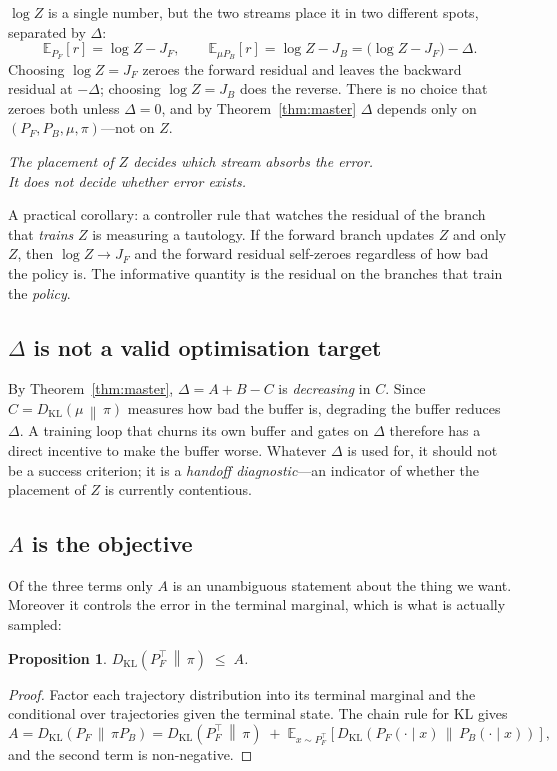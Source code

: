\documentclass[11pt]{article}
\theoremstyle{plain}
\newtheorem{proposition}[theorem]{Proposition}
\theoremstyle{definition}
\theoremstyle{remark}
\newcommand{\KL}[2]{D_{\mathrm{KL}}\!\left(#1 \,\middle\|\, #2\right)}
\newcommand{\E}[2]{\mathbb{E}_{#1}\!\left[#2\right]}
\newcommand{\PF}{P_{F}}
\newcommand{\PB}{P_{B}}
\newcommand{\JF}{J_{F}}
\newcommand{\JB}{J_{B}}
\begin{document}
$\log Z$ is a single number, but the two streams place it in two different spots,
separated by $\Delta$:
\[
  \E{\PF}{r} = \log Z - \JF,
  \qquad
  \E{\mu\PB}{r} = \log Z - \JB
  = \bigl(\log Z - \JF\bigr) - \Delta .
\]
Choosing $\log Z = \JF$ zeroes the forward residual and leaves the backward
residual at $-\Delta$; choosing $\log Z = \JB$ does the reverse. There is no
choice that zeroes both unless $\Delta = 0$, and by Theorem~\ref{thm:master}
$\Delta$ depends only on $(\PF,\PB,\mu,\pi)$---not on $Z$.

\begin{center}
\emph{The placement of $Z$ decides which stream absorbs the error.\\
It does not decide whether error exists.}
\end{center}

A practical corollary: a controller rule that watches the residual of the branch
that \emph{trains} $Z$ is measuring a tautology. If the forward branch updates
$Z$ and only $Z$, then $\log Z \to \JF$ and the forward residual self-zeroes
regardless of how bad the policy is. The informative quantity is the residual on
the branches that train the \emph{policy}.

\subsection{$\Delta$ is not a valid optimisation target}

By Theorem~\ref{thm:master}, $\Delta = A + B - C$ is \emph{decreasing} in $C$.
Since $C = \KL{\mu}{\pi}$ measures how bad the buffer is, degrading the buffer
reduces $\Delta$. A training loop that churns its own buffer and gates on
$\Delta$ therefore has a direct incentive to make the buffer worse. Whatever
$\Delta$ is used for, it should not be a success criterion; it is a
\emph{handoff diagnostic}---an indicator of whether the placement of $Z$ is
currently contentious.

\subsection{$A$ is the objective}

Of the three terms only $A$ is an unambiguous statement about the thing we want.
Moreover it controls the error in the terminal marginal, which is what is
actually sampled:

\begin{proposition}\label{prop:dpi}
$\KL{\PF^{\top}}{\pi} \;\le\; A$.
\end{proposition}
\begin{proof}
Factor each trajectory distribution into its terminal marginal and the
conditional over trajectories given the terminal state. The chain rule for KL
gives
\[
  A = \KL{\PF}{\pi\PB} = \KL{\PF^{\top}}{\pi} \;+\; \E{x\sim \PF^{\top}}{\KL{\PF(\cdot\mid x)}{\PB(\cdot\mid x)}},
\]
and the second term is non-negative.
\end{proof}
\end{document}
